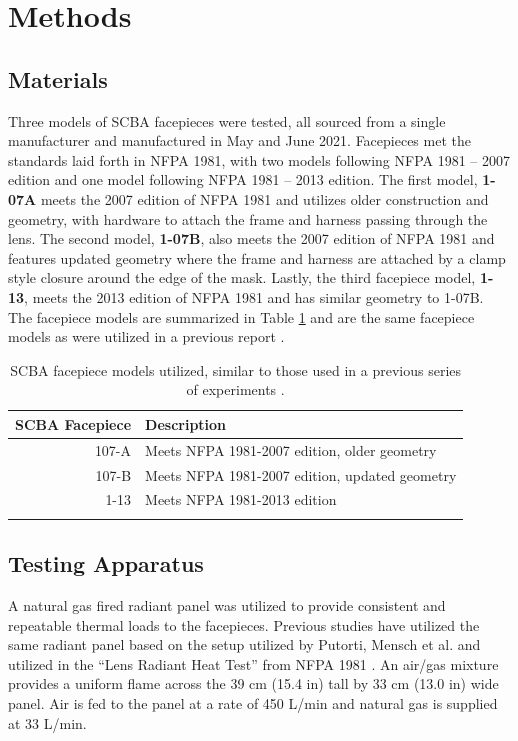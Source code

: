 \documentclass[sn-mathphys]{sn-jnl}%
\theoremstyle{thmstyleone}%
\theoremstyle{thmstyletwo}%
\theoremstyle{thmstylethree}%
\begin{document}
\section{Methods}\label{sec2}
\subsection{Materials}\label{subsec2}
Three models of SCBA facepieces were tested, all sourced from a single manufacturer and manufactured in May and June 2021. Facepieces met the standards laid forth in NFPA 1981, with two models following NFPA 1981 – 2007 edition and one model following NFPA 1981 – 2013 edition. The first model, \textbf{1-07A} meets the 2007 edition of NFPA 1981 and utilizes older construction and geometry, with hardware to attach the frame and harness passing through the lens. The second model, \textbf{1-07B}, also meets the 2007 edition of NFPA 1981 and features updated geometry where the frame and harness are attached by a clamp style closure around the edge of the mask. Lastly, the third facepiece model, \textbf{1-13}, meets the 2013 edition of NFPA 1981 and has similar geometry to 1-07B. The facepiece models are summarized in Table \ref{tab1} and are the same facepiece models as were utilized in a previous report \cite{kesler_mechanical_2018}. 

\begin{table}[h]
\begin{center}
\caption{SCBA facepiece models utilized, similar to those used in a previous series of experiments \cite{kesler_mechanical_2018}.}\label{tab1}%
\begin{tabular}{rl}
\toprule
SCBA Facepiece & Description  \\
\midrule
107-A    & Meets NFPA 1981-2007 edition, older geometry   \\
107-B    & Meets NFPA 1981-2007 edition, updated geometry     \\
1-13    & Meets NFPA 1981-2013 edition  \\
\botrule
\end{tabular}
\end{center}
\end{table}

\subsection{Testing Apparatus}\label{subsec3}

A natural gas fired radiant panel was utilized to provide consistent and repeatable thermal loads to the facepieces. Previous studies have utilized the same radiant panel \cite{horn_study_2017,kesler_mechanical_2018} based on the setup utilized by Putorti, Mensch et al.\cite{putorti_thermal_2013} and utilized in the “Lens Radiant Heat Test” from NFPA 1981 \cite{national_fire_protection_association_nfpa_2013}. An \mbox{air/gas} mixture provides a uniform flame across the 39 cm (15.4 in) tall by 33 cm (13.0 in) wide panel. Air is fed to the panel at a rate of 450 L/min and natural gas is supplied at 33 L/min. 
\end{document}
